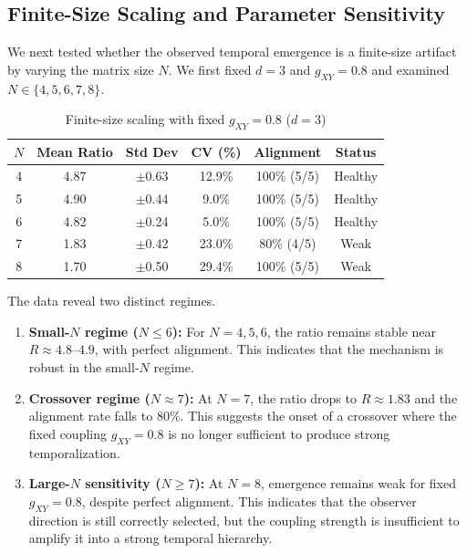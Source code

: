 \documentclass[12pt,a4paper]{article}
\begin{document}
\subsection{Finite-Size Scaling and Parameter Sensitivity}\label{sec:fss}

We next tested whether the observed temporal emergence is a finite-size
artifact by varying the matrix size $N$. We first fixed $d=3$ and
$g_{XY}=0.8$ and examined $N \in \{4,5,6,7,8\}$.

\begin{table}[ht]
\centering
\caption{Finite-size scaling with fixed $g_{XY}=0.8$ ($d=3$)}
\label{tab:fss_fixed}
\begin{tabular}{cccccc}
\toprule
$N$ & Mean Ratio & Std Dev & CV (\%) & Alignment & Status \\
\midrule
4 & 4.87 & $\pm$0.63 & 12.9\% & 100\% (5/5) & Healthy \\
5 & 4.90 & $\pm$0.44 & 9.0\%  & 100\% (5/5) & Healthy \\
6 & 4.82 & $\pm$0.24 & 5.0\%  & 100\% (5/5) & Healthy \\
7 & 1.83 & $\pm$0.42 & 23.0\% & 80\% (4/5)  & Weak \\
8 & 1.70 & $\pm$0.50 & 29.4\% & 100\% (5/5) & Weak \\
\bottomrule
\end{tabular}
\end{table}

The data reveal two distinct regimes.

\begin{enumerate}[leftmargin=*]
\item \textbf{Small-$N$ regime ($N \leq 6$):}
For $N=4,5,6$, the ratio remains stable near $R \approx 4.8$--$4.9$,
with perfect alignment. This indicates that the mechanism is robust in
the small-$N$ regime.

\item \textbf{Crossover regime ($N \approx 7$):}
At $N=7$, the ratio drops to $R \approx 1.83$ and the alignment rate falls
to 80\%. This suggests the onset of a crossover where the fixed coupling
$g_{XY}=0.8$ is no longer sufficient to produce strong temporalization.

\item \textbf{Large-$N$ sensitivity ($N \geq 7$):}
At $N=8$, emergence remains weak for fixed $g_{XY}=0.8$, despite perfect
alignment. This indicates that the observer direction is still correctly
selected, but the coupling strength is insufficient to amplify it into a
strong temporal hierarchy.
\end{enumerate}
\end{document}
